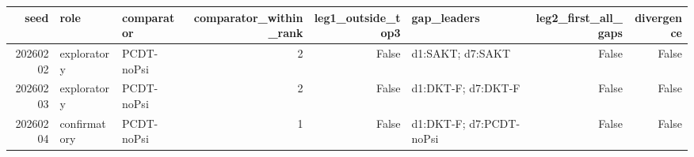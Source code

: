 \begin{tabular}{rllrrlrr}
\toprule
seed & role & comparator & comparator\_within\_rank & leg1\_outside\_top3 & gap\_leaders & leg2\_first\_all\_gaps & divergence \\
\midrule
20260202 & exploratory & PCDT-noPsi & 2 & False & d1:SAKT; d7:SAKT & False & False \\
20260203 & exploratory & PCDT-noPsi & 2 & False & d1:DKT-F; d7:DKT-F & False & False \\
20260204 & confirmatory & PCDT-noPsi & 1 & False & d1:DKT-F; d7:PCDT-noPsi & False & False \\
\bottomrule
\end{tabular}
